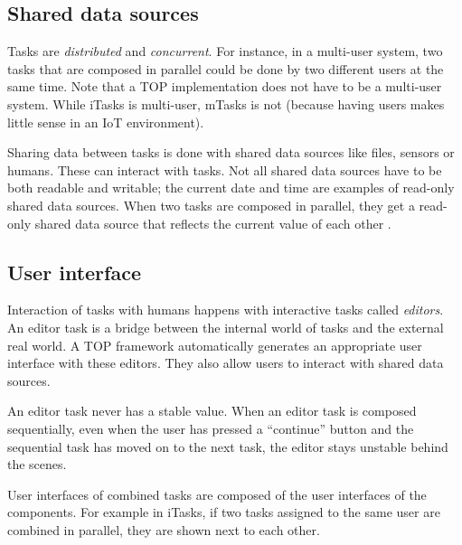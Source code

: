 \subsection{Shared data sources}\label{section-top-sds}
Tasks are \textit{distributed} and \textit{concurrent}. For instance, in a multi-user system, two tasks that are composed in parallel could be done by two different users at the same time. Note that a TOP implementation does not have to be a multi-user system. While iTasks is multi-user, mTasks is not (because having users makes little sense in an IoT environment).

Sharing data between tasks is done with shared data sources like files, sensors or humans. These can interact with tasks. Not all shared data sources have to be both readable and writable; the current date and time are examples of read-only shared data sources.
When two tasks are composed in parallel, they get a read-only shared data source that reflects the current value of each other \cite[\S 2.1]{plasmeijer2012task}.

\subsection{User interface}
Interaction of tasks with humans happens with interactive tasks called \textit{editors}. An editor task is a bridge between the internal world of tasks and the external real world.
A TOP framework automatically generates an appropriate user interface with these editors. They also allow users to interact with shared data sources.

An editor task never has a stable value. When an editor task is composed sequentially, even when the user has pressed a ``continue'' button and the sequential task has moved on to the next task, the editor stays unstable behind the scenes.

User interfaces of combined tasks are composed of the user interfaces of the components. For example in iTasks, if two tasks assigned to the same user are combined in parallel, they are shown next to each other. \cite[\S 4.2.4]{naus2020assisting}
